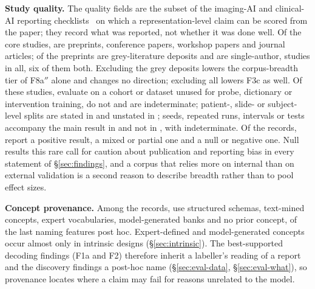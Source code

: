 \textbf{Study quality.} The quality fields are the subset of the imaging-AI and clinical-AI reporting
checklists~\cite{mongan2020claim,norgeot2020minimum} on which a representation-level claim can be scored
from the paper; they record what was reported, not whether it was done well. Of the \Ncore{} core
studies, \Npreprint{} are preprints, \Nconf{} conference papers, \Nwork{} workshop papers and \Njour{}
journal articles; \Ngrey{} of the preprints are grey-literature deposits and \Nsingle{} are
single-author, \Ngreysingle{} studies in all, six of them both. Excluding the grey deposits lowers the corpus-breadth tier of F8a$''$ alone and changes
no direction; excluding all \Ngreysingle{} lowers F3c as well. Of these studies, \Nextyes{} evaluate on a cohort or
dataset unused for probe, dictionary or intervention training, \Nextno{} do not and \Nextunk{} are
indeterminate; patient-, slide- or subject-level splits are stated in \Nsplityes{} and unstated in
\Nsplitno{}; seeds, repeated runs, intervals or tests accompany the main result in \Nseedyes{} and not
in \Nseedno{}, with \Nseedunk{} indeterminate. Of the \Nclaims{} records, \Ndirpos{} report a positive
result, \Ndirmix{} a mixed or partial one and \Ndirnull{} a null or negative one. Null results this rare
call for caution about publication and reporting bias in every statement of \S\ref{sec:findings}, and a
corpus that relies more on internal than on external validation is a second reason to describe breadth
rather than to pool effect sizes.

\textbf{Concept provenance.} Among the records, \Nprovlabel{} use structured schemas, \Nprovtext{}
text-mined concepts, \Nprovexpert{} expert vocabularies, \Nprovmodel{} model-generated banks and
\Nprovnone{} no prior concept, \Nposthocname{} of the last naming features post hoc. Expert-defined and
model-generated concepts occur almost only in intrinsic designs (\S\ref{sec:intrinsic}). The
best-supported decoding findings (F1a and F2) therefore inherit a labeller's reading of a
report~\cite{irvin2019chexpert,johnson2019mimicjpg} and the discovery findings a post-hoc name
(\S\ref{sec:eval-data}, \S\ref{sec:eval-what}), so provenance locates where a claim may fail for
reasons unrelated to the model.
